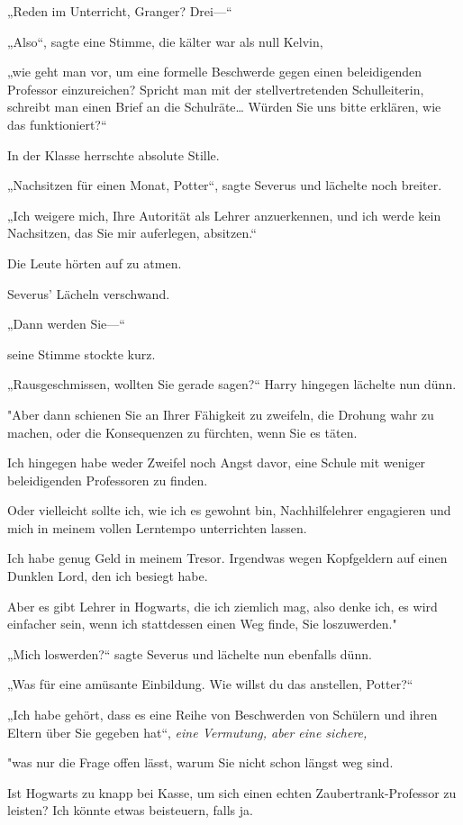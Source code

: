{„Reden im Unterricht, Granger? Drei—“

„Also“, sagte eine Stimme, die kälter war als null Kelvin,

„wie geht man vor, um eine formelle Beschwerde gegen einen beleidigenden Professor einzureichen? Spricht man mit der stellvertretenden Schulleiterin, schreibt man einen Brief an die Schulräte… Würden Sie uns bitte erklären, wie das funktioniert?“

In der Klasse herrschte absolute Stille.

„Nachsitzen für einen Monat, Potter“, sagte Severus und lächelte noch breiter.

„Ich weigere mich, Ihre Autorität als Lehrer anzuerkennen, und ich werde kein Nachsitzen, das Sie mir auferlegen, absitzen.“

Die Leute hörten auf zu atmen.

Severus' Lächeln verschwand.

„Dann werden Sie—“

seine Stimme stockte kurz.

„Rausgeschmissen, wollten Sie gerade sagen?“ Harry hingegen lächelte nun dünn.

"Aber dann schienen Sie an Ihrer Fähigkeit zu zweifeln, die Drohung wahr zu machen, oder die Konsequenzen zu fürchten, wenn Sie es täten.

Ich hingegen habe weder Zweifel noch Angst davor, eine Schule mit weniger beleidigenden Professoren zu finden.

Oder vielleicht sollte ich, wie ich es gewohnt bin, Nachhilfelehrer engagieren und mich in meinem vollen Lerntempo unterrichten lassen.

Ich habe genug Geld in meinem Tresor. Irgendwas wegen Kopfgeldern auf einen Dunklen Lord, den ich besiegt habe.

Aber es gibt Lehrer in Hogwarts, die ich ziemlich mag, also denke ich, es wird einfacher sein, wenn ich stattdessen einen Weg finde, Sie loszuwerden."

„Mich loswerden?“ sagte Severus und lächelte nun ebenfalls dünn.

„Was für eine amüsante Einbildung. Wie willst du das anstellen, Potter?“

„Ich habe gehört, dass es eine Reihe von Beschwerden von Schülern und ihren Eltern über Sie gegeben hat“, \emph{eine Vermutung, aber eine sichere,}

"was nur die Frage offen lässt, warum Sie nicht schon längst weg sind.

Ist Hogwarts zu knapp bei Kasse, um sich einen echten Zaubertrank-Professor zu leisten? Ich könnte etwas beisteuern, falls ja.

}
